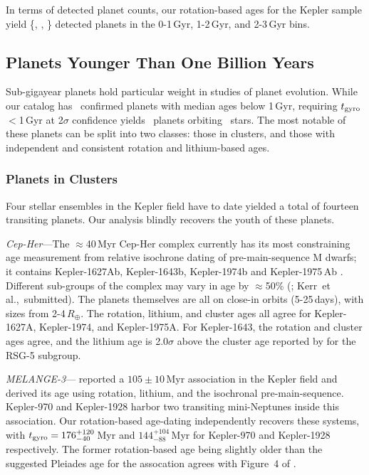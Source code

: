 \documentclass[11pt,twocolumn,tighten]{aastex63}
\begin{document}
In terms of detected planet counts, our rotation-based ages for the
Kepler sample yield \{\nplyounggyro, \nplmidgyro, \nploldgyro\}
detected planets in the 0-1\,Gyr, 1-2\,Gyr, and 2-3\,Gyr bins.  


\subsection{Planets Younger Than One Billion Years}

Sub-gigayear planets hold particular weight in studies of planet
evolution.
While our catalog has \nplyounggyro\ confirmed planets
with median ages below 1\,Gyr, requiring $t_{\rm gyro}$$<$1\,Gyr at
2$\sigma$ confidence yields \nplyounggyrotwosigma\ planets orbiting
\nplhostsyounggyrotwosigma\ stars.  
The most notable of these planets can be split into two classes: those
in clusters, and those with independent and consistent rotation and
lithium-based ages.

\subsubsection{Planets in Clusters}
\label{subsec:clusterplanets}

Four stellar ensembles in the Kepler field have to date yielded a
total of fourteen transiting planets.  Our analysis blindly recovers
the youth of these planets.

{\it Cep-Her}---The $\approx$40\,Myr Cep-Her complex currently has its
most constraining age measurement from relative isochrone dating of
pre-main-sequence M dwarfs; it contains Kepler-1627Ab, Kepler-1643b,
Kepler-1974b and Kepler-1975\,Ab \citep{Bouma_2022a,Bouma_2022b}.
Different sub-groups of the complex may vary in age by $\approx$50\%
(\citealt{Bouma_2022b}; Kerr~et al.,~submitted).  The planets
themselves are all on close-in orbits (5-25\,days), with sizes from
2-4\,$R_\oplus$.  The rotation, lithium, and cluster ages all agree
for Kepler-1627A, Kepler-1974, and Kepler-1975A.  For Kepler-1643, the
rotation and cluster ages agree, and the lithium age is 2.0$\sigma$
above the cluster age reported by \citet{Bouma_2022b} for the RSG-5
subgroup.

{\it MELANGE-3}---\citet{Barber_2022} reported a
$105\pm10$\,Myr association in the Kepler field and derived its age
using rotation, lithium, and the isochronal pre-main-sequence.
Kepler-970 and Kepler-1928 harbor two transiting mini-Neptunes inside
this association.  Our rotation-based
age-dating independently recovers these systems, with $t_{\rm
gyro}=176_{-40}^{+120}$\,Myr and $144_{-88}^{+104}$\,Myr for
Kepler-970 and Kepler-1928 respectively.  The former rotation-based
age being slightly older than the suggested Pleiades age for the
assocation agrees with Figure~4 of \citet{Barber_2022}.
\end{document}
